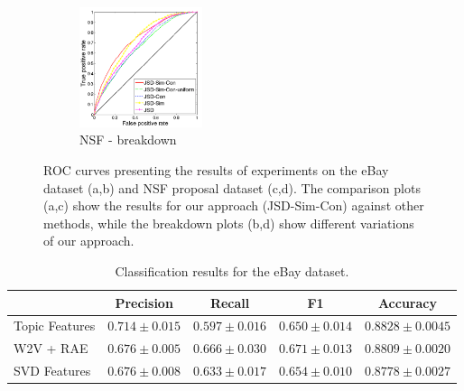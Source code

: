\documentclass{article} %
\begin{document}
\begin{figure}
        ~ %
        \begin{subfigure}[b]{0.24\textwidth}
        	        \centering
                \includegraphics[width=36mm]{figures/nsf-breakdown-kopia.png}
               \caption{NSF - breakdown}
                \label{fig:nsf-breakdown}
        \end{subfigure}
       \caption{ROC curves presenting the results of experiments on
         the eBay dataset (a,b) and NSF proposal dataset (c,d). The
         comparison plots (a,c) show the results for our approach (JSD-Sim-Con)
         against other methods, while the breakdown plots (b,d)
         show different variations of our approach. }\label{fig:roc-curves}
\end{figure}

\begin{table}[t]
\caption{Classification results for the eBay dataset.}
\label{tab:classification-results}
\vspace{-4mm}
\begin{center}
\begin{tabular}{|l|c|c|c|c|}
\hline
&Precision & Recall & F1 & Accuracy
\\ \hline 
Topic Features         &$\mathbf{0.714}\pm 0.015$&$0.597\pm 0.016$&$0.650\pm
0.014$& $\mathbf{0.8828}\pm 0.0045$\\
W2V + RAE             &$0.676\pm 0.005$&$\mathbf{0.666}\pm 0.030$&$\mathbf{0.671}\pm
0.013$&$0.8809\pm 0.0020$ \\
SVD Features             &$0.676\pm 0.008$&$0.633\pm 0.017$&$0.654\pm
0.010$&$0.8778\pm 0.0027$\\
\hline
\end{tabular}
\end{center}
\end{table}

\end{document}
